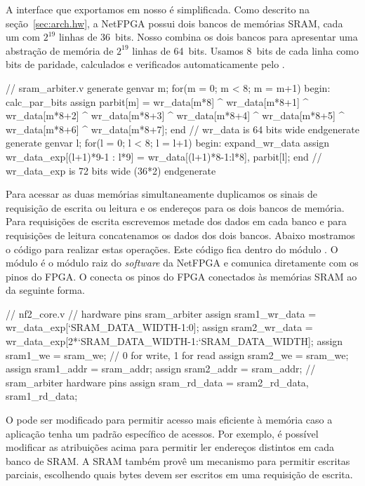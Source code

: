 A interface que exportamos em nosso  é simplificada.
Como descrito na seção~\ref{sec:arch.hw}, a NetFPGA possui dois bancos
de memórias SRAM, cada um com $2^{19}$ linhas de 36~bits.  Nosso
 combina os dois bancos para apresentar uma abstração
de memória de $2^{19}$ linhas de 64~bits.  Usamos 8~bits de cada linha
como bits de paridade, calculados e verificados automaticamente pelo
.

\begin{verilogcode}
   // sram_arbiter.v
   generate
      genvar m;
      for(m = 0; m < 8; m = m+1) begin: calc_par_bits
      assign parbit[m] = wr_data[m*8] ^ wr_data[m*8+1] ^
            wr_data[m*8+2] ^ wr_data[m*8+3] ^ wr_data[m*8+4] ^
            wr_data[m*8+5] ^ wr_data[m*8+6] ^ wr_data[m*8+7];
      end // wr_data is 64 bits wide
   endgenerate 
   generate
      genvar l;
      for(l = 0; l < 8; l = l+1) begin: expand_wr_data
         assign wr_data_exp[(l+1)*9-1 : l*9] =
            {wr_data[(l+1)*8-1:l*8], parbit[l]};
         end // wr_data_exp is 72 bits wide (36*2)
   endgenerate
\end{verilogcode}

Para acessar as duas memórias simultaneamente duplicamos os sinais de
requisição de escrita ou leitura e os endereços para os dois bancos de
memória.  Para requisições de escrita escrevemos metade dos dados em
cada banco e para requisições de leitura concatenamos os dados dos dois
bancos.  Abaixo mostramos o código para realizar estas operações.  Este
código fica dentro do módulo .  O módulo 
é o módulo raiz do \emph{software} da NetFPGA e comunica diretamente com
os pinos do FPGA.  O  conecta os pinos do FPGA conectados
às memórias SRAM ao  da seguinte forma.

\begin{verilogcode}
// nf2_core.v
// hardware pins       sram_arbiter
assign sram1_wr_data = wr_data_exp[`SRAM_DATA_WIDTH-1:0];
assign sram2_wr_data = wr_data_exp[2*`SRAM_DATA_WIDTH-1:`SRAM_DATA_WIDTH];
assign sram1_we      = sram_we; // 0 for write, 1 for read
assign sram2_we      = sram_we;
assign sram1_addr    = sram_addr;
assign sram2_addr    = sram_addr;
// sram_arbiter        hardware pins
assign sram_rd_data  = {sram2_rd_data, sram1_rd_data};
\end{verilogcode}

O  pode ser modificado para permitir acesso mais
eficiente à memória caso a aplicação tenha um padrão específico de
acessos.  Por exemplo, é possível modificar as atribuições acima para
permitir ler endereços distintos em cada banco de SRAM.  A SRAM também
provê um mecanismo para permitir escritas parciais, escolhendo quais
bytes devem ser escritos em uma requisição de escrita.\footnotemark{}

